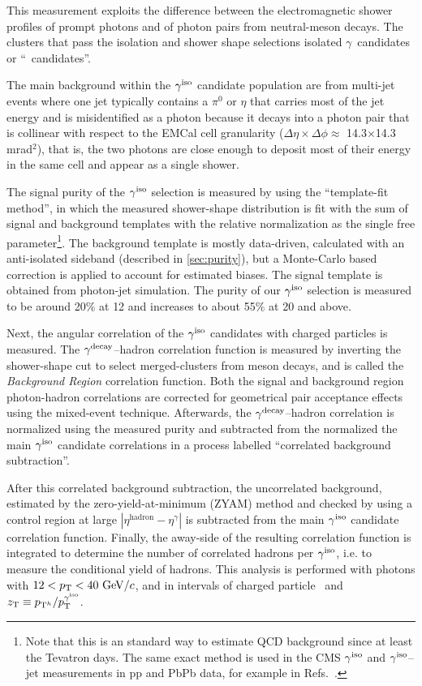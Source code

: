 This measurement exploits the difference between the electromagnetic shower profiles of prompt photons and of photon pairs from neutral-meson decays. The clusters that pass the isolation and shower shape selections isolated $\gamma$~candidates or ``\gammaiso~candidates''. 

The main background within the $\gamma^\mathrm{iso}$ candidate population are from multi-jet events where one jet typically contains a $\pi^{0}$ or $\eta$ that carries most of the jet energy and is misidentified as a photon because it decays into a photon pair that is collinear with respect to the EMCal cell granularity ($\Delta\eta\times\Delta\phi\approx$  14.3$\times$14.3 mrad$^{2}$), that is, the two photons are close enough to deposit most of their energy in the same cell and appear as a single shower. 

The signal purity of the $\gamma^\mathrm{iso}$ selection is measured by using the ``template-fit method'', in which the measured shower-shape distribution is fit with the sum of signal and background templates with the relative normalization as the single free parameter\footnote{Note that this is an standard way to estimate QCD background since at least the Tevatron days. The same exact method is used in the CMS $\gamma^\mathrm{iso}$ and $\gamma^\mathrm{iso}$--jet measurements in pp and PbPb data, for example in Refs.~\cite{Sirunyan:2018gro,Chatrchyan:2012gt}.}. The background template is mostly data-driven, calculated with an anti-isolated sideband (described in \ref{sec:purity}), but a Monte-Carlo based correction is applied to account for estimated biases. The signal template is obtained from photon-jet simulation. The purity of our $\gamma^\mathrm{iso}$ selection is measured to be around 20$\%$ at {12 \GeVc} and increases to about 55$\%$ at {20 \GeVc} and above. 

Next, the angular correlation of the $\gamma^\mathrm{iso}$ candidates with charged particles is measured.  The {$\gamma^\mathrm{decay}$--hadron} correlation function is measured by inverting the shower-shape cut to select merged-clusters from meson decays, and is called the \textit{Background Region} correlation function. Both the signal and background region photon-hadron correlations are corrected for geometrical pair acceptance effects using the mixed-event technique. Afterwards, the $\gamma^\mathrm{decay}$--hadron correlation is normalized using the measured purity and subtracted from the normalized the main $\gamma^\mathrm{iso}$ candidate correlations in a process labelled ``correlated background subtraction''.

After this correlated background subtraction, the uncorrelated background, estimated by the zero-yield-at-minimum (ZYAM) method \cite{Sickles2010} and checked by using a control region at large $|\eta^{\mathrm{hadron}}-\eta^{\gamma}|$ is subtracted from the main $\gamma^\mathrm{iso}$ candidate correlation function. Finally, the away-side of the resulting correlation function is integrated to determine the number of correlated hadrons per $\gamma^\mathrm{iso}$, i.e. to measure the conditional yield of hadrons. This analysis is performed with photons with $12<p_{\mathrm{T}} <40~\mathrm{GeV}/c$, and in intervals of charged particle \pt~and $z_{\mathrm{T}} \equiv p_{\mathrm{T}^h}/p_{\mathrm{T}}^{\mathrm{\gamma^\mathrm{iso}}}$. 

